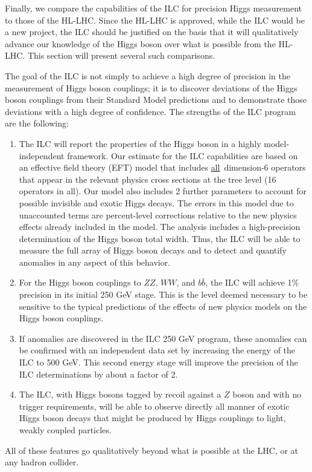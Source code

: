 Finally, we compare the capabilities of the ILC for precision Higgs
measurement to those of the HL-LHC.  Since the HL-LHC is approved,
while the ILC would be a new project, the ILC should be justified on
the basis that it will qualitatively advance our knowledge of the Higgs
boson over what is possible from the HL-LHC.  
This section will present several such comparisons.

The goal of the ILC is not simply to achieve a high degree of
precision in the measurement of Higgs boson couplings; it is to
discover deviations of the Higgs boson couplings from their Standard
Model predictions and to demonstrate those deviations with a high
degree of confidence.  The strengths of the ILC program are the
 following:
\begin{enumerate}
\item The ILC will report the properties of the Higgs boson in a
  highly model-independent framework.   Our estimate for the ILC capabilities
  are based on an effective field theory (EFT) model that includes
 {\underline{all}}\ dimension-6 operators that appear in the relevant physics
  cross sections at the tree level  (16 operators in all).   Our model
  also includes 2 further parameters to account for possible invisible
  and exotic Higgs decays.  The errors in this model due to
  unaccounted terms are percent-level corrections relative to the new
  physics effects already included in the model.   The analysis includes a
  high-precision determination of the Higgs boson total width. 
 Thus, the ILC will be able to measure  the full array of Higgs 
boson decays and to detect and quantify anomalies in any aspect of this behavior.
\item  For the Higgs boson couplings to $ZZ$, $WW$, and $b\bar b$, 
the ILC will achieve 1\% precision in its initial 250 GeV
  stage.   This is the
 level deemed necessary to be sensitive to the typical predictions 
of the effects of new physics models on the Higgs boson couplings.
\item  If  anomalies are  discovered in the ILC 
250 GeV program, these
  anomalies can be confirmed with an independent data set by
  increasing the energy of the ILC to 500 GeV.   This second energy
  stage will improve the precision of the ILC 
determinations by about a factor of 2.  
\item The ILC, with Higgs bosons tagged by recoil against a $Z$ boson
  and with no trigger requirements, will be able to observe directly
  all manner of exotic Higgs boson decays that might be produced by
Higgs couplings  to  light, weakly coupled  particles.
\end{enumerate}
All of these features go qualitatively beyond what is possible at the 
LHC, or at any hadron collider.

